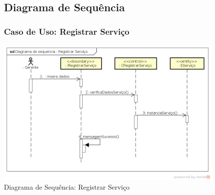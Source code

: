 \documentclass[
	12pt,				%
	openright,
	oneside,			%
	a4paper,			%
	chapter=TITLE,		%
	brazil				%
	]{abntex2}
\begin{document}
\begin{figure}[h!]
\subsection{Diagrama de Sequência}

\subsubsection*{Caso de Uso: Registrar Serviço}


	\caption{Diagrama de Sequência: Registrar Serviço}
	\begin{center}
	    \includegraphics[scale=0.5]{Arquivos/Projeto/D_registrar_servico}  
	\end{center}
\end{figure}
\end{document}
